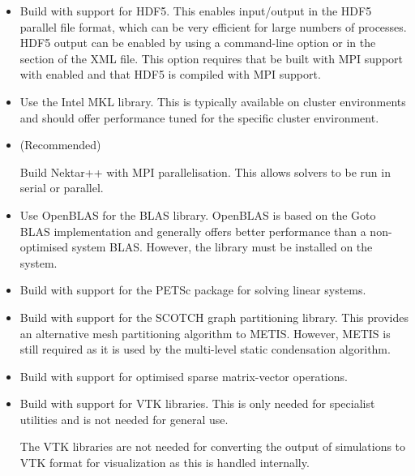 \begin{itemize}
    \item {}

    Build \nekpp with support for HDF5. This enables input/output in the HDF5
    parallel file format, which can be very efficient for large numbers of
    processes. HDF5 output can be enabled by using a command-line option or
    in the  section of the XML file. This option requires 
    that \nekpp be built with MPI support with  enabled
    and that HDF5 is compiled with MPI support.

    \item {}

    Use the Intel MKL library. This is typically available on cluster
    environments and should offer performance tuned for the specific cluster
    environment.

    \item {} (Recommended)

    Build Nektar++ with MPI parallelisation. This allows solvers to be run in
    serial or parallel.

    \item {}

    Use OpenBLAS for the BLAS library. OpenBLAS is based on the Goto BLAS
    implementation and generally offers better performance than a non-optimised
    system BLAS. However, the library must be installed on the system.

    \item {}

    Build \nekpp with support for the PETSc package for solving linear systems.

    \item {}

    Build \nekpp with support for the SCOTCH graph partitioning library. This
    provides an alternative mesh partitioning algorithm to METIS. However, METIS
    is still required as it is used by the multi-level static condensation
    algorithm.

    \item {}

    Build \nekpp with support for optimised sparse matrix-vector operations.

    \item {}

    Build \nekpp with support for VTK libraries. This is only needed for
    specialist utilities and is not needed for general use.

    \begin{notebox}
    The VTK libraries are not needed for converting the output of simulations to
    VTK format for visualization as this is handled internally.
    \end{notebox}
\end{itemize}

